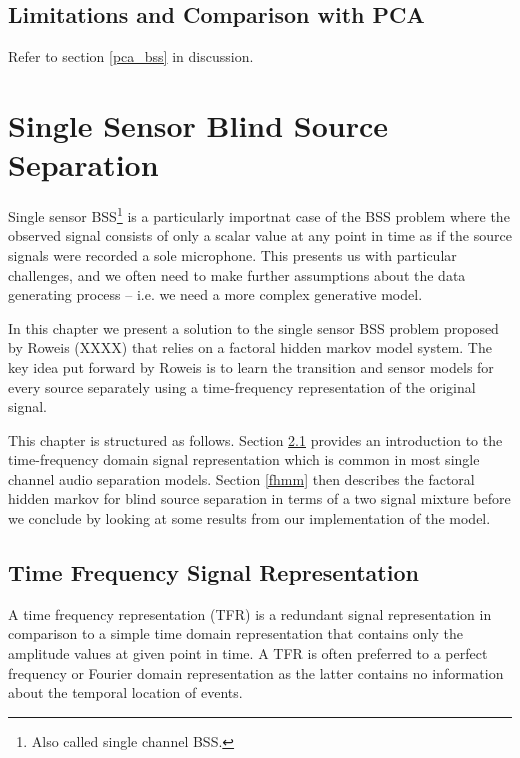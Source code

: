 \documentclass[11pt, oneside, a4paper]{report}
\begin{document}
\section{Limitations and Comparison with PCA}\label{ica_conclusions}

Refer to section \ref{pca_bss} in discussion.


\chapter{Single Sensor Blind Source Separation}\label{ssbss_chap}

Single sensor BSS\footnote{Also called single channel BSS.} is a
particularly importnat case of the BSS problem where the observed
signal consists of only a scalar value at any point in time as if the
source signals were recorded a sole microphone. This presents us with
particular challenges, and we often need to make further assumptions
about the data generating process -- i.e. we need a more complex
generative model.

In this chapter we present  a solution to the single sensor BSS
problem proposed by Roweis (XXXX)\cite{roweis} that relies on a
factoral hidden markov model system. The key idea put forward by
Roweis is to learn the transition and sensor models for every source
separately using a time-frequency  representation of the original signal.

This chapter is structured as follows. Section \ref{timeFreqRep}
provides an introduction to the time-frequency domain signal
representation which is common in most single channel audio separation
models. Section \ref{fhmm} then describes the factoral hidden
markov for blind source separation in terms of a two signal mixture
before we conclude by looking at some results from our implementation
of the model.


\section{Time Frequency Signal Representation}\label{timeFreqRep}
A time frequency representation (TFR) is a redundant signal
representation in comparison to a simple time domain representation that
contains only the amplitude values at given point in time. A TFR
is often preferred to a perfect frequency or Fourier
domain representation as the latter contains no information about the
temporal location of events.


\end{document}
